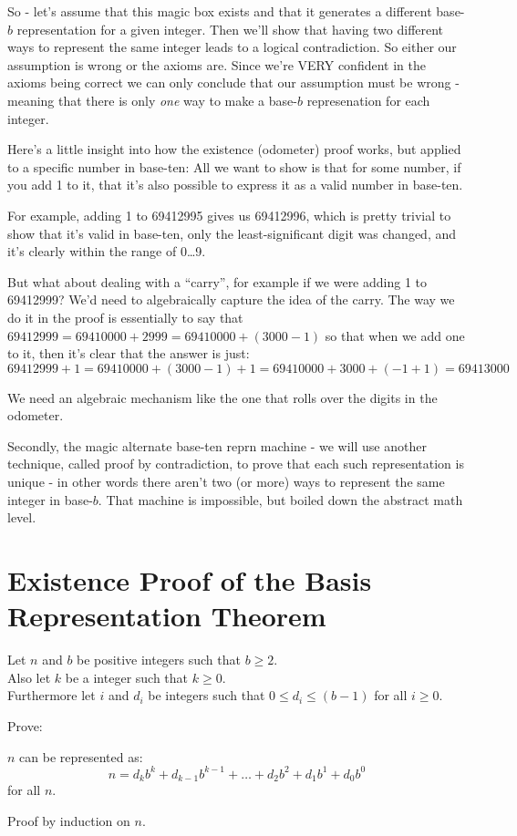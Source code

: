 \documentclass{article}
\newenvironment{jprIn}{\begin{adjustwidth}{2em}{}}{\end{adjustwidth}}
\begin{document}
So - let's assume that this magic box exists and that it
generates a different base-$b$ representation for a given integer.
Then we'll show that having two different ways to represent the same integer
leads to a logical contradiction.  So either our
assumption is wrong or the axioms are.
Since we're VERY confident in the axioms being correct we can only 
conclude that our assumption must be wrong - meaning
that there is only \emph{one} way 
to make a base-$b$ represenation for each integer.

Here's a little insight into how the existence (odometer) proof works, but applied to a specific number in base-ten:
All we want to show is that for some number, if you add 1 to it, that it's also possible to express it as a valid number in base-ten.

For example, adding 1 to 69412995 gives us 69412996, which is pretty trivial to show that it's valid in base-ten, only the least-significant digit was
changed, and it's clearly within the range of 0\dots{}9.

But what about dealing with a ``carry'', for example 
if we were adding 1 to 69412999? We'd need to algebraically capture the idea of the carry.  The way
we do it in the proof is essentially to say that $69412999 = 69410000 + 2999 = 69410000 + (3000-1)$ so that when we add one to it, then
it's clear that the answer is just:
\[69412999 + 1 = 69410000 + (3000-1) + 1 = 69410000 + 3000 + (-1 + 1) = 69413000\]

We need an algebraic mechanism like the one that rolls over the digits in the odometer.

Secondly, the magic alternate base-ten reprn machine - we will use another technique, called proof by contradiction,
to prove that each such representation is unique - in other
words there aren't two (or more) ways to represent the same integer in base-$b$.  That machine is impossible, but
boiled down the abstract math level.

\section*{Existence Proof of the Basis Representation Theorem}
Let $n$ and $b$ be positive integers such that $b\ge2$.\\
Also let $k$ be a integer such that $k\ge0$.\\
Furthermore let $i$ and $d_i$ be integers such that $0\le{}d_i\le{}(b-1)$ for all $i\ge0$.

Prove:
\begin{jprIn}
$n$ can be represented as:
\[n=d_kb^k+d_{k-1}b^{k-1}+\dots+d_2b^2+d_1b^1+d_0b^0\]
for all $n$.
\end{jprIn}
Proof by induction on $n$.
\end{document}
